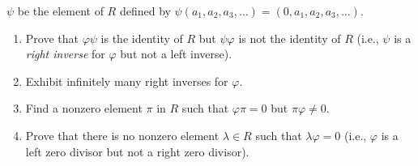 \begin{enumerate}
                  $\psi$ be the element of $R$ defined by
                  $\psi(a_1, a_2, a_3, \ldots) = (0, a_1, a_2, a_3, \ldots)$.
                  \begin{enumerate}
                     \item Prove that $\varphi\psi$ is the identity of $R$ but
                           $\psi\varphi$ is not the identity of $R$ (i.e.,
                           $\psi$ is a \textit{right inverse} for $\varphi$ but
                           not a left inverse).
                     \item Exhibit infinitely many right inverses for $\varphi$.
                     \item Find a nonzero element $\pi$ in $R$ such that
                           $\varphi\pi = 0$ but $\pi\varphi \neq 0$.
                     \item Prove that there is no nonzero element
                           $\lambda \in R$ such that $\lambda\varphi = 0$ (i.e.,
                           $\varphi$ is a left zero divisor but not a right zero
                           divisor).
                  \end{enumerate}
\end{enumerate}
